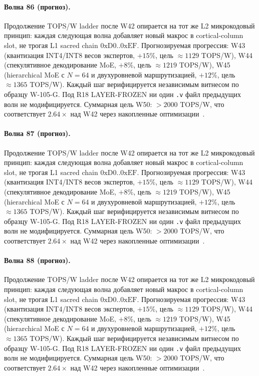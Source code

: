 \paragraph{Волна 86 (прогноз).} Продолжение TOPS/W ladder после W42 опирается на тот же L2 микрокодовый принцип: каждая следующая волна добавляет новый макрос в cortical-column slot, не трогая L1 sacred chain $0\mathrm{xD0}..0\mathrm{xEF}$. Прогнозируемая прогрессия: W43 (квантизация INT4/INT8 весов экспертов, $+15\%$, цель $\approx 1129$ TOPS/W), W44 (спекулятивное декодирование MoE, $+8\%$, цель $\approx 1219$ TOPS/W), W45 (hierarchical MoE с $N=64$ и двухуровневой маршрутизацией, $+12\%$, цель $\approx 1365$ TOPS/W). Каждый шаг верифицируется независимым витнесом по образцу W-105-G. Под R18 LAYER-FROZEN ни один \texttt{.v} файл предыдущих волн не модифицируется. Суммарная цель W50: $> 2000$ TOPS/W, что соответствует $2{.}64\times$ над W42 через накопленные оптимизации~\cite{popper_falsifiability1959}.

\paragraph{Волна 87 (прогноз).} Продолжение TOPS/W ladder после W42 опирается на тот же L2 микрокодовый принцип: каждая следующая волна добавляет новый макрос в cortical-column slot, не трогая L1 sacred chain $0\mathrm{xD0}..0\mathrm{xEF}$. Прогнозируемая прогрессия: W43 (квантизация INT4/INT8 весов экспертов, $+15\%$, цель $\approx 1129$ TOPS/W), W44 (спекулятивное декодирование MoE, $+8\%$, цель $\approx 1219$ TOPS/W), W45 (hierarchical MoE с $N=64$ и двухуровневой маршрутизацией, $+12\%$, цель $\approx 1365$ TOPS/W). Каждый шаг верифицируется независимым витнесом по образцу W-105-G. Под R18 LAYER-FROZEN ни один \texttt{.v} файл предыдущих волн не модифицируется. Суммарная цель W50: $> 2000$ TOPS/W, что соответствует $2{.}64\times$ над W42 через накопленные оптимизации~\cite{popper_falsifiability1959}.

\paragraph{Волна 88 (прогноз).} Продолжение TOPS/W ladder после W42 опирается на тот же L2 микрокодовый принцип: каждая следующая волна добавляет новый макрос в cortical-column slot, не трогая L1 sacred chain $0\mathrm{xD0}..0\mathrm{xEF}$. Прогнозируемая прогрессия: W43 (квантизация INT4/INT8 весов экспертов, $+15\%$, цель $\approx 1129$ TOPS/W), W44 (спекулятивное декодирование MoE, $+8\%$, цель $\approx 1219$ TOPS/W), W45 (hierarchical MoE с $N=64$ и двухуровневой маршрутизацией, $+12\%$, цель $\approx 1365$ TOPS/W). Каждый шаг верифицируется независимым витнесом по образцу W-105-G. Под R18 LAYER-FROZEN ни один \texttt{.v} файл предыдущих волн не модифицируется. Суммарная цель W50: $> 2000$ TOPS/W, что соответствует $2{.}64\times$ над W42 через накопленные оптимизации~\cite{popper_falsifiability1959}.

